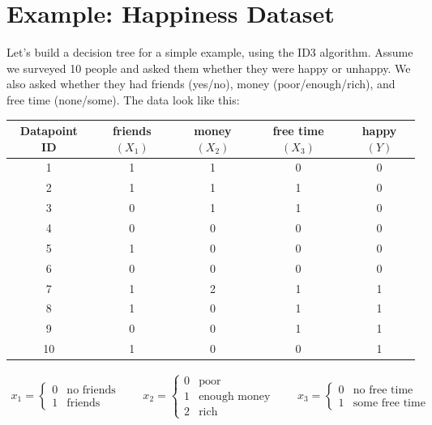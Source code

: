 
\section{Example: Happiness Dataset \label{section:happiness}}

Let's build a decision tree for a simple example, using the ID3 algorithm. Assume we surveyed 10 people and asked them whether they were happy or unhappy. We also asked whether they had friends (yes/no), money (poor/enough/rich), and free time (none/some). The data look like this:

{\small
\begin{center}
\begin{tabular}{ccccc}
\toprule
Datapoint ID & friends $(X_1)$ & money $(X_2)$ & free time $(X_3)$ & happy $(Y)$ \\
\midrule
1 & 1 & 1 & 0 & 0 \\
2 & 1 & 1 & 1 & 0 \\
3 & 0 & 1 & 1 & 0 \\
4 & 0 & 0 & 0 & 0 \\
5 & 1 & 0 & 0 & 0 \\
6 & 0 & 0 & 0 & 0 \\
\midrule
7 & 1 & 2 & 1 & 1 \\
8 & 1 & 0 & 1 & 1 \\
9 & 0 & 0 & 1 & 1 \\
10 & 1 & 0 & 0 & 1 \\
\bottomrule
\end{tabular}

\begin{align*}
	x_1 = \left\{ \begin{array}{cc} 0 & \text{no friends} \\ 1 & \text{friends} \end{array} \right.
	\qquad
	x_2 = \left\{ \begin{array}{cc} 0 & \text{poor} \\ 1 & \text{enough money} \\ 2 & \text{rich} \end{array} \right.
	\qquad
	x_3 = \left\{ \begin{array}{cc} 0 & \text{no free time} \\ 1 & \text{some free time} \end{array} \right.
\end{align*}
\end{center}
}

